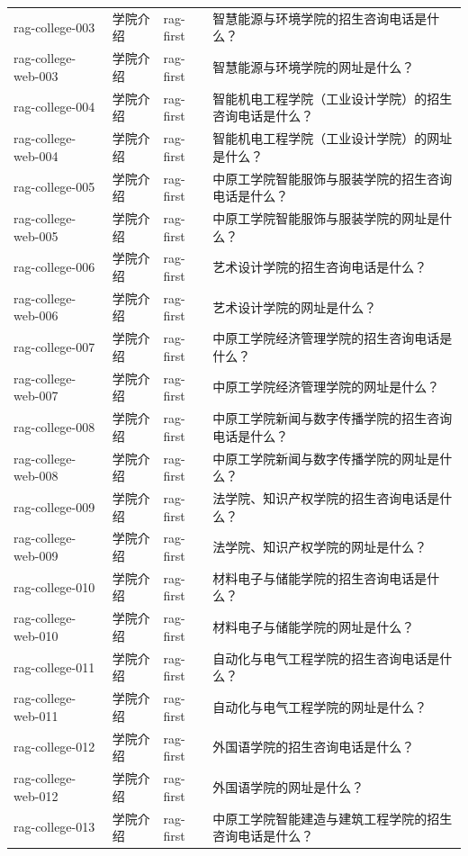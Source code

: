 \documentclass[UTF8,zihao=-4,oneside]{ctexbook}
\numberwithin{equation}{chapter}
\begin{document}
{\begin{longtable}{p{}p{}p{}p{}}
  rag-college-003 & 学院介绍 & rag-first & 智慧能源与环境学院的招生咨询电话是什么？ \\
  rag-college-web-003 & 学院介绍 & rag-first & 智慧能源与环境学院的网址是什么？ \\
  rag-college-004 & 学院介绍 & rag-first & 智能机电工程学院（工业设计学院）的招生咨询电话是什么？ \\
  rag-college-web-004 & 学院介绍 & rag-first & 智能机电工程学院（工业设计学院）的网址是什么？ \\
  rag-college-005 & 学院介绍 & rag-first & 中原工学院智能服饰与服装学院的招生咨询电话是什么？ \\
  rag-college-web-005 & 学院介绍 & rag-first & 中原工学院智能服饰与服装学院的网址是什么？ \\
  rag-college-006 & 学院介绍 & rag-first & 艺术设计学院的招生咨询电话是什么？ \\
  rag-college-web-006 & 学院介绍 & rag-first & 艺术设计学院的网址是什么？ \\
  rag-college-007 & 学院介绍 & rag-first & 中原工学院经济管理学院的招生咨询电话是什么？ \\
  rag-college-web-007 & 学院介绍 & rag-first & 中原工学院经济管理学院的网址是什么？ \\
  rag-college-008 & 学院介绍 & rag-first & 中原工学院新闻与数字传播学院的招生咨询电话是什么？ \\
  rag-college-web-008 & 学院介绍 & rag-first & 中原工学院新闻与数字传播学院的网址是什么？ \\
  rag-college-009 & 学院介绍 & rag-first & 法学院、知识产权学院的招生咨询电话是什么？ \\
  rag-college-web-009 & 学院介绍 & rag-first & 法学院、知识产权学院的网址是什么？ \\
  rag-college-010 & 学院介绍 & rag-first & 材料电子与储能学院的招生咨询电话是什么？ \\
  rag-college-web-010 & 学院介绍 & rag-first & 材料电子与储能学院的网址是什么？ \\
  rag-college-011 & 学院介绍 & rag-first & 自动化与电气工程学院的招生咨询电话是什么？ \\
  rag-college-web-011 & 学院介绍 & rag-first & 自动化与电气工程学院的网址是什么？ \\
  rag-college-012 & 学院介绍 & rag-first & 外国语学院的招生咨询电话是什么？ \\
  rag-college-web-012 & 学院介绍 & rag-first & 外国语学院的网址是什么？ \\
  rag-college-013 & 学院介绍 & rag-first & 中原工学院智能建造与建筑工程学院的招生咨询电话是什么？ \\

\end{longtable}}
\end{document}
